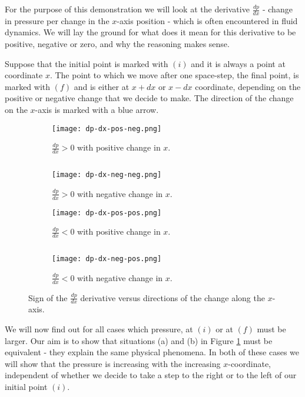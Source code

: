 For the purpose of this demonstration we will look at the derivative $\frac{dp}{dx}$ - change in pressure per change in the $x$-axis position - which is often encountered in fluid dynamics. We will lay the ground for what does it mean for this derivative to be positive, negative or zero, and why the reasoning makes sense.

Suppose that the initial point is marked with \textcolor{myblue}{$(i)$} and it is always a point at coordinate $x$. The point to which we move after one space-step, the final point, is marked with \textcolor{myblue}{$(f)$} and is either at $x+dx$ or $x - dx$ coordinate, depending on the positive or negative change that we decide to make. The direction of the change on the $x$-axis is marked with a blue arrow.

\begin{figure}[H]
\begin{subfigure}[t]{.46\textwidth}
\centering
\texttt{[image: dp-dx-pos-neg.png]}
\caption{$\frac{dp}{dx} > 0$ with positive change in $x$.}
\end{subfigure}
\begin{minipage}[t]{.07\textwidth}
$ $
\vspace*{1.5cm}
\end{minipage}
\begin{subfigure}[t]{.46\textwidth}
\centering
\texttt{[image: dp-dx-neg-neg.png]}
\caption{$\frac{dp}{dx} > 0$ with negative change in $x$.}
\end{subfigure}
\begin{subfigure}[t]{.46\textwidth}
\centering
\texttt{[image: dp-dx-pos-pos.png]}
\caption{$\frac{dp}{dx} < 0$ with positive change in $x$.}
\end{subfigure}
\begin{minipage}[t]{.08\textwidth}
$ $
\end{minipage}
\begin{subfigure}[t]{.46\textwidth}
\centering
\texttt{[image: dp-dx-neg-pos.png]}
\caption{$\frac{dp}{dx} < 0$ with negative change in $x$. }
\end{subfigure}
\caption{Sign of the $\frac{dp}{dx}$ derivative versus directions of the change along the $x$-axis.}
\label{fig:dp-dx-signs}
\end{figure}

We will now find out for all cases which pressure, at \textcolor{myblue}{$(i)$} or at \textcolor{myblue}{$(f)$} must be larger. Our aim is to show that situations (a) and (b) in Figure \ref{fig:dp-dx-signs} must be equivalent - they explain the same physical phenomena. In both of these cases we will show that the pressure is increasing with the increasing $x$-coordinate, independent of whether we decide to take a step to the right or to the left of our initial point \textcolor{myblue}{$(i)$}. 

